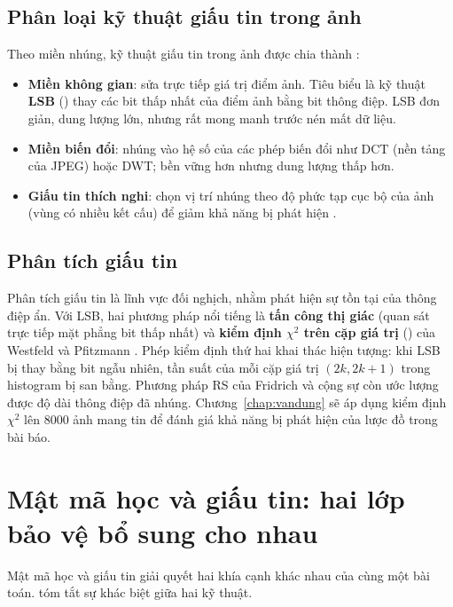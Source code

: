 \subsection{Phân loại kỹ thuật giấu tin trong ảnh}

Theo miền nhúng, kỹ thuật giấu tin trong ảnh được chia thành \cite{cheddad2010}:
\begin{itemize}
  \item \textbf{Miền không gian}: sửa trực tiếp giá trị điểm ảnh. Tiêu biểu là kỹ thuật
        \textbf{LSB} () thay các bit thấp nhất của điểm ảnh bằng bit
        thông điệp. LSB đơn giản, dung lượng lớn, nhưng rất mong manh trước nén mất dữ liệu.
  \item \textbf{Miền biến đổi}: nhúng vào hệ số của các phép biến đổi như DCT (nền tảng của
        JPEG) hoặc DWT; bền vững hơn nhưng dung lượng thấp hơn.
  \item \textbf{Giấu tin thích nghi}: chọn vị trí nhúng theo độ phức tạp cục bộ của ảnh (vùng
        có nhiều kết cấu) để giảm khả năng bị phát hiện \cite{holub2014}.
\end{itemize}

\subsection{Phân tích giấu tin}

Phân tích giấu tin là lĩnh vực đối nghịch, nhằm phát hiện sự tồn tại của thông điệp ẩn. Với
LSB, hai phương pháp nổi tiếng là \textbf{tấn công thị giác} (quan sát trực tiếp mặt phẳng bit
thấp nhất) và \textbf{kiểm định $\chi^2$ trên cặp giá trị} () của Westfeld
và Pfitzmann \cite{westfeld2000}. Phép kiểm định thứ hai khai thác hiện tượng: khi LSB bị thay
bằng bit ngẫu nhiên, tần suất của mỗi cặp giá trị $(2k, 2k+1)$ trong histogram bị san bằng.
Phương pháp RS của Fridrich và cộng sự \cite{fridrich2001} còn ước lượng được độ dài thông
điệp đã nhúng. Chương~\ref{chap:vandung} sẽ áp dụng kiểm định $\chi^2$ lên 8000 ảnh mang tin để
đánh giá khả năng bị phát hiện của lược đồ trong bài báo.

\section{Mật mã học và giấu tin: hai lớp bảo vệ bổ sung cho nhau}

Mật mã học và giấu tin giải quyết hai khía cạnh khác nhau của cùng một bài toán.
 tóm tắt sự khác biệt giữa hai kỹ thuật.

